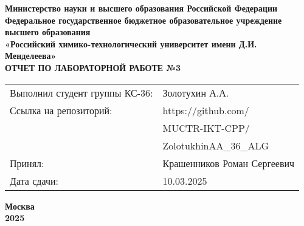 \documentclass[12pt, a4paper]{report}
\begin{document}
	\begin{titlepage}
		\begin{center}
			\large \textbf{Министерство науки и высшего образования Российской Федерации} \\
			\large \textbf{Федеральное государственное бюджетное образовательное учреждение высшего образования} \\
			\large \textbf{«Российский химико-технологический университет имени Д.И. Менделеева»} \\

			\vspace*{4cm}
			\LARGE \textbf{ОТЧЕТ ПО ЛАБОРАТОРНОЙ РАБОТЕ №3}

			\vspace*{4cm}
			\begin{flushright}
				\Large
				\begin{tabular}{>{\raggedleft\arraybackslash}p{9cm} p{10cm}}
					Выполнил студент группы КС-36: & Золотухин А.А. \\
					Ссылка на репозиторий: & https://github.com/ \\
					& MUCTR-IKT-CPP/ \\
					& ZolotukhinAA\_36\_ALG \\
					Принял: & Крашенников Роман Сергеевич \\
					Дата сдачи: & 10.03.2025 \\
				\end{tabular}
			\end{flushright}

			\vspace*{6cm}
			\Large \textbf{Москва \\ 2025}
		\end{center}
	\end{titlepage}

	\tableofcontents
	\thispagestyle{empty}
	\newpage

\end{document}
